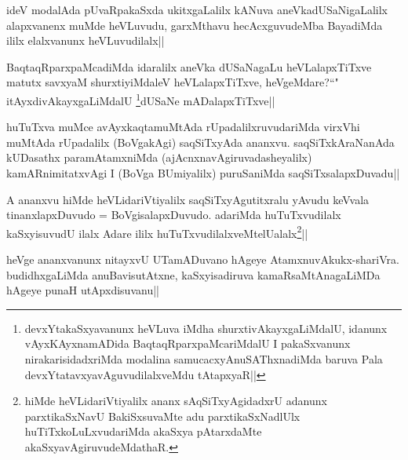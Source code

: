 \begin{artha}
ideV modalAda pUvaRpakaSxda ukitxgaLalilx kANuva aneVkadUSaNigaLalilx alapxvanenx muMde heVLuvudu, garxMthavu hecAcxguvudeMba BayadiMda ililx elalxvanunx heVLuvudilalx||
\end{artha}


\begin{artha}
BaqtaqRparxpaMcadiMda idaralilx aneVka dUSaNagaLu heVLalapxTiTxve matutx savxyaM 
shurxtiyiMdaleV heVLalapxTiTxve, heVgeMdare?``\stext" itAyxdivAkayxgaLiMdalU
\footnote[1]{devxYtakaSxyavanunx heVLuva iMdha shurxtivAkayxgaLiMdalU, idanunx vAyxKAyxnamADida BaqtaqRparxpaMcariMdalU I pakaSxvanunx nirakarisidadxriMda modalina samucacxyAnuSAThxnadiMda baruva Pala  devxYtatavxyavAguvudilalxveMdu tAtapxyaR||}dUSaNe 
mADalapxTiTxve||
\end{artha}


\begin{artha}
huTuTxva muMce avAyxkaqtamuMtAda rUpadalilxruvudariMda virxVhi muMtAda rUpadalilx (BoVgakAgi) saqSiTxyAda ananxvu. saqSiTxkAraNanAda kUDasathx paramAtamxniMda (ajAcnxnavAgiruvadasheyalilx) kamARnimitatxvAgi I (BoVga BUmiyalilx) puruSaniMda saqSiTxsalapxDuvadu||
\end{artha}


\begin{artha}
A ananxvu hiMde heVLidariVtiyalilx saqSiTxyAgutitxralu yAvudu keVvala tinanxlapxDuvudo = BoVgisalapxDuvudo. adariMda huTuTxvudilalx kaSxyisuvudU ilalx Adare ililx huTuTxvudilalxveMtelUalalx\footnote[1]{hiMde heVLidariVtiyalilx ananx sAqSiTxyAgidadxrU adanunx parxtikaSxNavU BakiSxsuvaMte adu parxtikaSxNadlUlx huTiTxkoLuLxvudariMda akaSxya pAtarxdaMte akaSxyavAgiruvudeMdathaR.}||
\end{artha}


\begin{artha}
heVge ananxvanunx nitayxvU UTamADuvano hAgeye AtamxnuvAkukx-shariVra. budidhxgaLiMda 
anuBavisutAtxne, kaSxyisadiruva kamaRsaMtAnagaLiMDa hAgeye punaH utApxdisuvanu||
\end{artha}


